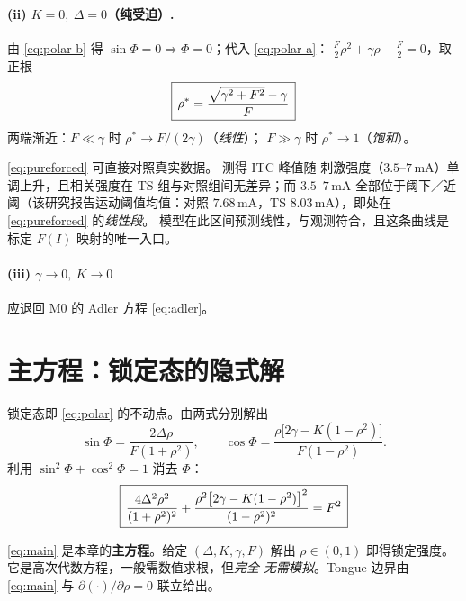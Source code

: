 \paragraph{(ii) $K=0,\ \Delta=0$（纯受迫）.}
由 \cref{eq:polar-b} 得 $\sin\Phi=0\Rightarrow\Phi=0$；代入 \cref{eq:polar-a}：
$\frac{F}{2}\rho^2+\gamma\rho-\frac{F}{2}=0$，取正根
%
\begin{equation}\label{eq:pureforced}
\boxed{\,\rho^{*}=\frac{\sqrt{\gamma^2+F^2}-\gamma}{F}\,}
\end{equation}
%
两端渐近：$F\ll\gamma$ 时 $\rho^{*}\to F/(2\gamma)$（\emph{线性}）；
$F\gg\gamma$ 时 $\rho^{*}\to1$（\emph{饱和}）。

\begin{remark}[第一个零参数形状预测]\label{rem:ITC}
\cref{eq:pureforced} 可直接对照真实数据。\citet{Morera2026} 测得 ITC 峰值随
刺激强度（$3.5$–$7\,$mA）单调上升，且相关强度在 TS 组与对照组间无差异；而
$3.5$–$7\,$mA 全部位于阈下／近阈（该研究报告运动阈值均值：对照
$7.68\,$mA，TS $8.03\,$mA），即处在 \cref{eq:pureforced} 的\emph{线性段}。
模型在此区间预测线性，与观测符合，且这条曲线是标定 $F(I)$ 映射的唯一入口。
\end{remark}

\paragraph{(iii) $\gamma\to0,\ K\to0$} 应退回 M0 的 Adler 方程 \cref{eq:adler}。

\section{主方程：锁定态的隐式解}
\label{sec:mainEq}

锁定态即 \cref{eq:polar} 的不动点。由两式分别解出
%
\begin{equation}\label{eq:sincos}
\sin\Phi=\frac{2\Delta\rho}{F(1+\rho^2)},
\qquad
\cos\Phi=\frac{\rho\bigl[2\gamma-K(1-\rho^2)\bigr]}{F(1-\rho^2)} .
\end{equation}
%
利用 $\sin^2\Phi+\cos^2\Phi=1$ 消去 $\Phi$：
%
\begin{equation}\label{eq:main}
\boxed{\,\frac{4\Delta^2\rho^2}{(1+\rho^2)^2}
      +\frac{\rho^2\bigl[2\gamma-K(1-\rho^2)\bigr]^2}{(1-\rho^2)^2}=F^2\,}
\end{equation}

\noindent\cref{eq:main} 是本章的\textbf{主方程}。给定 $(\Delta,K,\gamma,F)$ 解出
$\rho\in(0,1)$ 即得锁定强度。它是高次代数方程，一般需数值求根，但\emph{完全
无需模拟}。Tongue 边界由 \cref{eq:main} 与 $\partial(\cdot)/\partial\rho=0$
联立给出。

